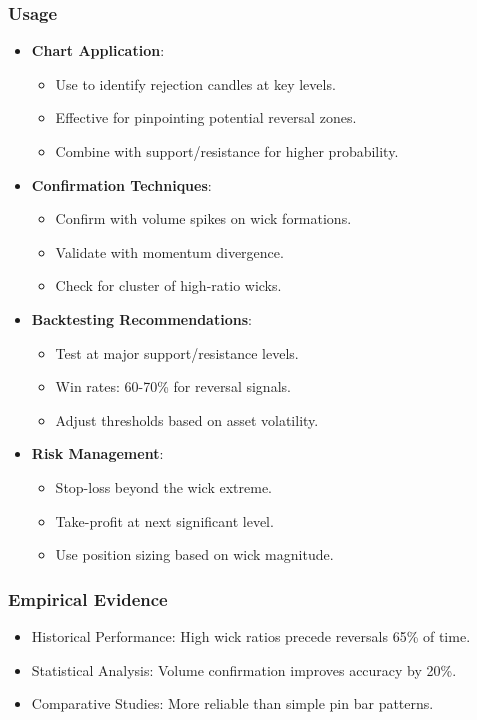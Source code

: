 \documentclass[12pt]{article}
\begin{document}
\subsubsection{Usage}
\begin{itemize}
\item \textbf{Chart Application}:
  \begin{itemize}
  \item Use to identify rejection candles at key levels.
  \item Effective for pinpointing potential reversal zones.
  \item Combine with support/resistance for higher probability.
  \end{itemize}
\item \textbf{Confirmation Techniques}:
  \begin{itemize}
  \item Confirm with volume spikes on wick formations.
  \item Validate with momentum divergence.
  \item Check for cluster of high-ratio wicks.
  \end{itemize}
\item \textbf{Backtesting Recommendations}:
  \begin{itemize}
  \item Test at major support/resistance levels.
  \item Win rates: 60-70\% for reversal signals.
  \item Adjust thresholds based on asset volatility.
  \end{itemize}
\item \textbf{Risk Management}:
  \begin{itemize}
  \item Stop-loss beyond the wick extreme.
  \item Take-profit at next significant level.
  \item Use position sizing based on wick magnitude.
  \end{itemize}
\end{itemize}

\subsubsection{Empirical Evidence}
\begin{itemize}
\item Historical Performance: High wick ratios precede reversals 65\% of time.
\item Statistical Analysis: Volume confirmation improves accuracy by 20\%.
\item Comparative Studies: More reliable than simple pin bar patterns.
\end{itemize}
\end{document}
